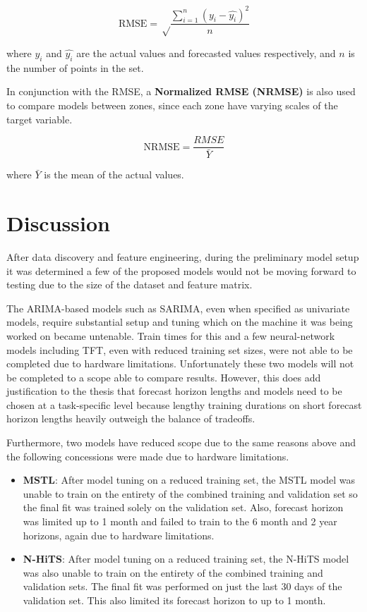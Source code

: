 \documentclass[sigconf]{acmart}
\begin{document}
\begin{equation}
\text{RMSE} =\sqrt\frac{\sum_{i=1}^{n}(y_i - \hat{y_i})^2}{n}
\end{equation}

where $y_i$ and $\hat{y_i}$ are the actual values and forecasted values respectively, and $n$ is the number of points in the set.

In conjunction with the RMSE, a \textbf{Normalized RMSE (NRMSE)} is also used to compare models between zones, since each zone have varying scales of the target variable.

\begin{equation}
\text{NRMSE} = \frac{RMSE}{\bar{Y}}
\end{equation}

where $\bar{Y}$ is the mean of the actual values.

\section{Discussion}

After data discovery and feature engineering, during the preliminary model setup it was determined a few of the proposed models would not be moving forward to testing due to the size of the dataset and feature matrix. 

The ARIMA-based models such as SARIMA, even when specified as univariate models, require substantial setup and tuning which on the machine it was being worked on became untenable. Train times for this and a few neural-network models including TFT, even with reduced training set sizes, were not able to be completed due to hardware limitations. Unfortunately these two models will not be completed to a scope able to compare results. However, this does add justification to the thesis that forecast horizon lengths and models need to be chosen at a task-specific level because lengthy training durations on short forecast horizon lengths heavily outweigh the balance of tradeoffs.

Furthermore, two models have reduced scope due to the same reasons above and the following concessions were made due to hardware limitations.

\begin{itemize}
  \item{\textbf{MSTL}: After model tuning on a reduced training set, the MSTL model was unable to train on the entirety of the combined training and validation set so the final fit was trained solely on the validation set. Also, forecast horizon was limited up to 1 month and failed to train to the 6 month and 2 year horizons, again due to hardware limitations.}

  \item{\textbf{N-HiTS}: After model tuning on a reduced training set, the N-HiTS model was also unable to train on the entirety of the combined training and validation sets. The final fit was performed on just the last 30 days of the validation set. This also limited its forecast horizon to up to 1 month.}
  \end{itemize}
  
\end{document}
